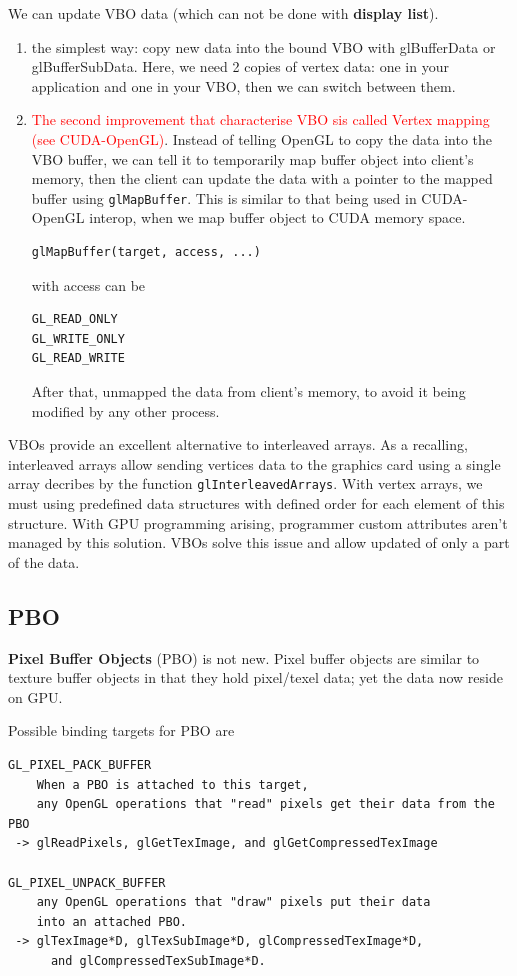 We can update VBO data (which can not be done with
{\bf display list}).
\begin{enumerate}
\item the simplest way: copy new data into the bound VBO with
  glBufferData or glBufferSubData. Here, we need 2 copies of vertex
  data: one in your application and one in your VBO, then we can
  switch between them. 

\item
  \textcolor{red}{ The second improvement that characterise VBO sis
    called Vertex mapping (see CUDA-OpenGL)}.  Instead of telling
  OpenGL to copy the data into the VBO buffer, we can tell it to
  temporarily map buffer object into client's memory, then the
  client can update the data with a pointer to the mapped buffer
  using \verb!glMapBuffer!. This is similar to that being used in
  CUDA-OpenGL interop, when we map buffer object to CUDA memory
  space.
\begin{verbatim}
glMapBuffer(target, access, ...)
\end{verbatim}
  with access can be
\begin{verbatim}
GL_READ_ONLY
GL_WRITE_ONLY
GL_READ_WRITE
\end{verbatim}

  After that, unmapped the data from client's memory, to avoid it being
  modified by any other process.
\end{enumerate}


VBOs provide an excellent alternative to interleaved arrays. As a
recalling, interleaved arrays allow sending vertices data to the
graphics card using a single array decribes by the function
\verb!glInterleavedArrays!. With vertex arrays, we must using
predefined data structures with defined order for each element of this
structure. With GPU programming arising, programmer custom attributes
aren't managed by this solution. VBOs solve this issue and allow
updated of only a part of the data.


\subsection{PBO}
\label{sec:pbo}

{\bf Pixel Buffer Objects} (PBO) is not new. Pixel buffer objects are
similar to texture buffer objects in that they hold pixel/texel data;
yet the data now reside on GPU.

Possible binding targets for PBO are
\begin{verbatim}
GL_PIXEL_PACK_BUFFER
    When a PBO is attached to this target, 
    any OpenGL operations that "read" pixels get their data from the PBO
 -> glReadPixels, glGetTexImage, and glGetCompressedTexImage
  
GL_PIXEL_UNPACK_BUFFER
    any OpenGL operations that "draw" pixels put their data 
    into an attached PBO.
 -> glTexImage*D, glTexSubImage*D, glCompressedTexImage*D,
      and glCompressedTexSubImage*D.


\end{verbatim}

